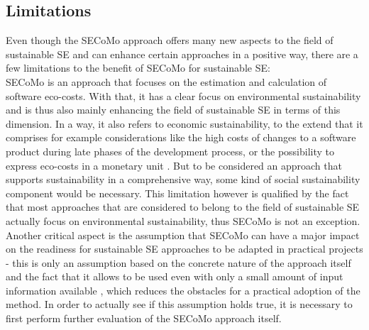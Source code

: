 \documentclass[oribibl]{llncs}
\begin{document}
\subsection{Limitations} %
Even though the SECoMo approach offers many new aspects to the field of sustainable SE and can enhance certain approaches in a positive way, there are a few limitations to the benefit of SECoMo for sustainable SE:\\ %
SECoMo is an approach that focuses on the estimation and calculation of software eco-costs. With that, it has a clear focus on environmental sustainability and is thus also mainly enhancing the field of sustainable SE in terms of this dimension. In a way, it also refers to economic sustainability, to the extend that it comprises for example considerations like the high costs of changes to a software product during late phases of the development process, or the possibility to express eco-costs in a monetary unit \cite{schulze_cost_2016}. %
But to be considered an approach that supports sustainability in a comprehensive way, some kind of social sustainability component would be necessary. %
This limitation however is qualified %
by the fact that most approaches that are considered to belong to the field of sustainable SE actually focus on environmental sustainability, thus SECoMo is not an exception.\\
Another critical aspect is the assumption that SECoMo can have a major impact on the readiness for sustainable SE approaches to be adapted in practical projects - this is only an assumption based on the concrete nature of the approach itself and the fact that it allows to be used even with only a small amount of input information available \cite{schulze_cost_2016}, which reduces the obstacles for a practical adoption of the method. In order to actually see if this assumption holds true, it is necessary to first perform further evaluation of the SECoMo approach itself.
\end{document}
